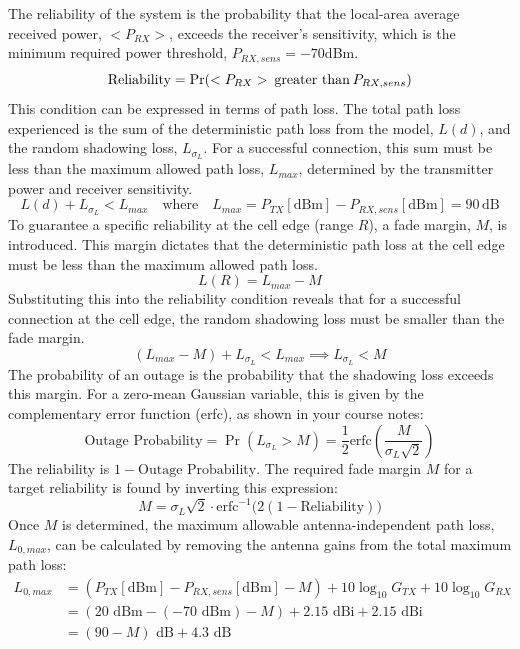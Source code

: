 The reliability of the system is the probability that the local-area average received power, $<P_{RX}>$, exceeds the receiver's sensitivity, which is the minimum required power threshold, $P_{RX,{sens}} = -70$dBm.
\begin{equation}
	\text{Reliability} = \Pr(<P_{RX}> \hspace{0.2em} \text{greater than} \hspace{0.2em} P_{RX,{sens}})
\end{equation}
This condition can be expressed in terms of path loss. The total path loss experienced is the sum of the deterministic path loss from the model, $L(d)$, and the random shadowing loss, $L_{\sigma_L}$. For a successful connection, this sum must be less than the maximum allowed path loss, $L_{max}$, determined by the transmitter power and receiver sensitivity.
\begin{equation}
	L(d) + L_{\sigma_L} < L_{max} \quad \text{where} \quad L_{max} = P_{TX}[\text{dBm}] - P_{RX,{sens}}[\text{dBm}] = 90 \, \mathrm{dB}
\end{equation}
To guarantee a specific reliability at the cell edge (range $R$), a {fade margin}, $M$, is introduced. This margin dictates that the deterministic path loss at the cell edge must be less than the maximum allowed path loss.
\begin{equation}
	L(R) = L_{max} - M
\end{equation}
Substituting this into the reliability condition reveals that for a successful connection at the cell edge, the random shadowing loss must be smaller than the fade margin.
\begin{equation}
	(L_{max} - M) + L_{\sigma_L} < L_{max} \implies L_{\sigma_L} < M
\end{equation}
The probability of an outage is the probability that the shadowing loss exceeds this margin. For a zero-mean Gaussian variable, this is given by the complementary error function (erfc), as shown in your course notes:
\begin{equation}
	\text{Outage Probability} = \Pr(L_{\sigma_L} > M) = \frac{1}{2} \text{erfc}\left(\frac{M}{\sigma_L\sqrt{2}}\right)
\end{equation}
The reliability is $1 - \text{Outage Probability}$. The required fade margin $M$ for a target reliability is found by inverting this expression:
\begin{equation}
	\label{eq:fade_margin_calc}
	M = \sigma_L \sqrt{2} \cdot \text{erfc}^{-1}\big(2(1 - \text{Reliability})\big)
\end{equation}
Once $M$ is determined, the maximum allowable antenna-independent path loss, $L_{0,max}$, can be calculated by removing the antenna gains from the total maximum path loss:
\begin{align}
	L_{0,max} &= (P_{TX}[\text{dBm}] - P_{RX,{sens}}[\text{dBm}] - M) + 10 \log_{10} G_{TX} + 10 \log_{10} G_{RX} \\
	&= (20 \text{ dBm} - (-70 \text{ dBm}) - M) + 2.15 \text{ dBi} + 2.15 \text{ dBi} \\
	&= (90 - M) \text{ dB} + 4.3 \text{ dB} \\
\end{align}

